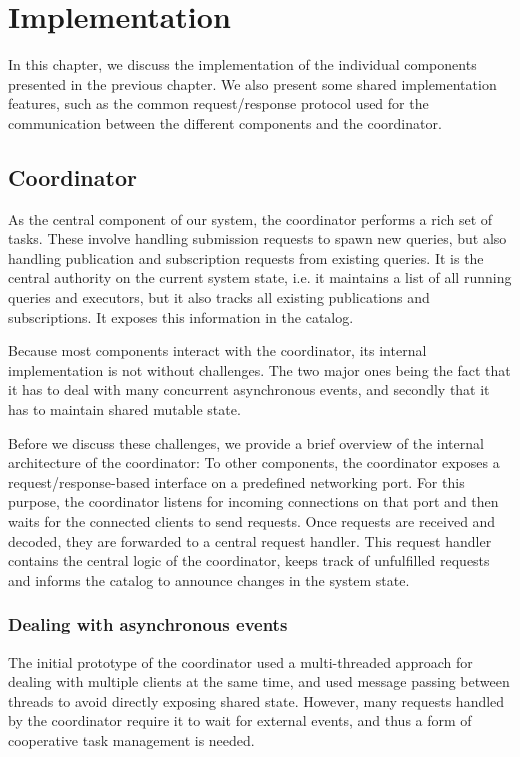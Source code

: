 \chapter{Implementation}\label{ch:impl}

In this chapter, we discuss the implementation of the individual components
presented in the previous chapter. We also present some shared implementation
features, such as the common request/response protocol used for the
communication between the different components and the coordinator.

\section{Coordinator}

As the central component of our system, the coordinator performs a rich
set of tasks. These involve handling submission requests to spawn new queries,
but also handling publication and subscription requests from existing queries.
It is the central authority on the current system state, i.e. it maintains
a list of all running queries and executors, but it also tracks all existing
publications and subscriptions. It exposes this information in the catalog.

Because most components interact with the coordinator, its
internal implementation is not without challenges. The two major ones
being the fact that it has to deal with many concurrent asynchronous events,
and secondly that it has to maintain shared mutable state.

Before we discuss these challenges, we provide a brief overview of the
internal architecture of the coordinator: To other components, the coordinator
exposes a request/response-based interface on a predefined networking port.
For this purpose, the coordinator listens for incoming connections on that port
and then waits for the connected clients to send requests. Once requests are
received and decoded, they are forwarded to a central request handler. This
request handler contains the central logic of the coordinator, keeps track of
unfulfilled requests and informs the catalog to announce changes in the
system state.

\subsection{Dealing with asynchronous events}
The initial prototype of the coordinator used a multi-threaded approach for dealing
with multiple clients at the same time, and used message passing between threads
to avoid directly exposing shared state. However, many requests handled by
the coordinator require it to wait for external events, and thus a form of
cooperative task management is needed.

